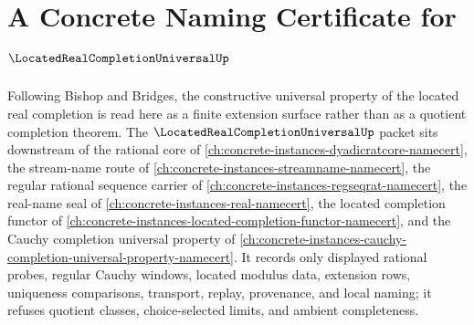 \chapter{A Concrete Naming Certificate for $\LocatedRealCompletionUniversalUp$}
\label{ch:concrete-instances-located-real-completion-universal-namecert}

Following Bishop and Bridges, the constructive universal property of the located real completion is read here as a finite extension surface rather than as a quotient completion theorem. The $\LocatedRealCompletionUniversalUp$ packet sits downstream of the rational core of \autoref{ch:concrete-instances-dyadicratcore-namecert}, the stream-name route of \autoref{ch:concrete-instances-streamname-namecert}, the regular rational sequence carrier of \autoref{ch:concrete-instances-regseqrat-namecert}, the real-name seal of \autoref{ch:concrete-instances-real-namecert}, the located completion functor of \autoref{ch:concrete-instances-located-completion-functor-namecert}, and the Cauchy completion universal property of \autoref{ch:concrete-instances-cauchy-completion-universal-property-namecert}. It records only displayed rational probes, regular Cauchy windows, located modulus data, extension rows, uniqueness comparisons, transport, replay, provenance, and local naming; it refuses quotient classes, choice-selected limits, and ambient completeness.

